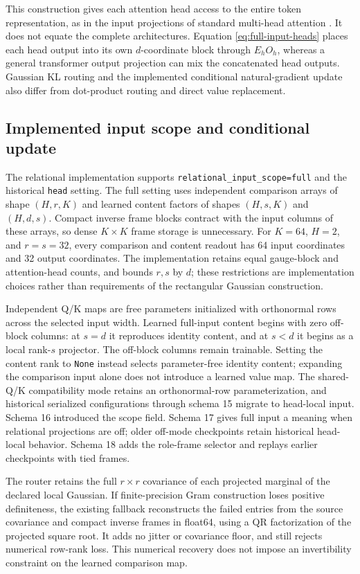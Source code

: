 \documentclass[11pt,letterpaper]{article}
\theoremstyle{remark}
\begin{document}
This construction gives each attention head access to the entire token representation, as in the input projections of standard multi-head attention \cite{Vaswani2017}. It does not equate the complete architectures. Equation \eqref{eq:full-input-heads} places each head output into its own $d$-coordinate block through $E_hO_h$, whereas a general transformer output projection can mix the concatenated head outputs. Gaussian KL routing and the implemented conditional natural-gradient update also differ from dot-product routing and direct value replacement.

\subsection{Implemented input scope and conditional update}
The relational implementation supports \texttt{relational\_input\_scope=full} and the historical \texttt{head} setting. The full setting uses independent comparison arrays of shape $(H,r,K)$ and learned content factors of shapes $(H,s,K)$ and $(H,d,s)$. Compact inverse frame blocks contract with the input columns of these arrays, so dense $K\times K$ frame storage is unnecessary. For $K=64$, $H=2$, and $r=s=32$, every comparison and content readout has 64 input coordinates and 32 output coordinates. The implementation retains equal gauge-block and attention-head counts, and bounds $r,s$ by $d$; these restrictions are implementation choices rather than requirements of the rectangular Gaussian construction.

Independent Q/K maps are free parameters initialized with orthonormal rows across the selected input width. Learned full-input content begins with zero off-block columns: at $s=d$ it reproduces identity content, and at $s<d$ it begins as a local rank-$s$ projector. The off-block columns remain trainable. Setting the content rank to \texttt{None} instead selects parameter-free identity content; expanding the comparison input alone does not introduce a learned value map. The shared-Q/K compatibility mode retains an orthonormal-row parameterization, and historical serialized configurations through schema 15 migrate to head-local input. Schema 16 introduced the scope field. Schema 17 gives full input a meaning when relational projections are off; older off-mode checkpoints retain historical head-local behavior. Schema 18 adds the role-frame selector and replays earlier checkpoints with tied frames.

The router retains the full $r\times r$ covariance of each projected marginal of the declared local Gaussian. If finite-precision Gram construction loses positive definiteness, the existing fallback reconstructs the failed entries from the source covariance and compact inverse frames in float64, using a QR factorization of the projected square root. It adds no jitter or covariance floor, and still rejects numerical row-rank loss. This numerical recovery does not impose an invertibility constraint on the learned comparison map.
\end{document}
